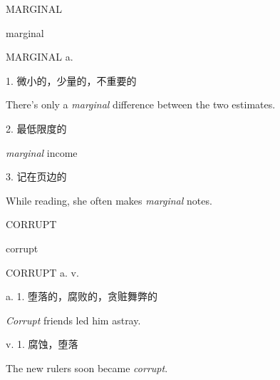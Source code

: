 \begin{flashcard}{
MARGINAL

marginal
}
\begin{center}
MARGINAL a. 
\end{center}
1. 微小的，少量的，不重要的

There's only a \textit{marginal} difference between the two estimates.

2. 最低限度的

\textit{marginal} income

3. 记在页边的

While reading, she often makes \textit{marginal} notes.

\end{flashcard}
\begin{flashcard}{
CORRUPT

corrupt
}
\begin{center}
CORRUPT a. v. 
\end{center}
a. 1. 堕落的，腐败的，贪赃舞弊的

\textit{Corrupt} friends led him astray.

v. 1. 腐蚀，堕落

The new rulers soon became \textit{corrupt}.

\end{flashcard}
